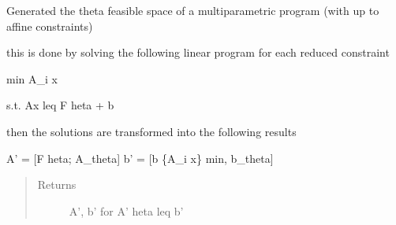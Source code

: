 \documentclass[letterpaper,10pt,english]{sphinxmanual}
\begin{document}
\begin{fulllineitems}
\begin{fulllineitems}
\end{fulllineitems}


\begin{fulllineitems}
\label{\detokenize{ppopt:ppopt.mplp_program.MPLP_Program.gen_feasible_theta_space}}
\sphinxAtStartPar
Generated the theta feasible space of a multiparametric program (with up to affine constraints)

\sphinxAtStartPar
this is done by solving the following linear program for each reduced constraint

\sphinxAtStartPar
min \sphinxhyphen{}A\_i x

\sphinxAtStartPar
s.t. Ax leq F  heta + b

\sphinxAtStartPar
then the solutions are transformed into the following results

\sphinxAtStartPar
A’ = {[}\sphinxhyphen{}F        heta; A\_theta{]}
b’ = {[}b \sphinxhyphen{} \{A\_i x\} min, b\_theta{]}
\begin{quote}\begin{description}
\item[{Returns}] \leavevmode
\sphinxAtStartPar
A’, b’ for A’  heta leq b’

\end{description}\end{quote}

\end{fulllineitems}


\begin{fulllineitems}
\label{\detokenize{ppopt:ppopt.mplp_program.MPLP_Program.gen_optimal_active_set}}
\end{fulllineitems}



\end{fulllineitems}
\end{document}
